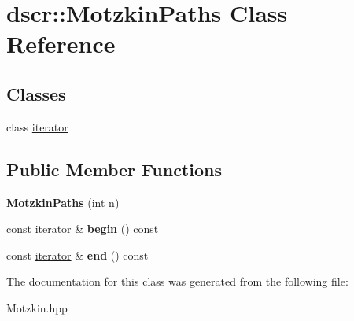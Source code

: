 \hypertarget{classdscr_1_1_motzkin_paths}{\section{dscr\-:\-:Motzkin\-Paths Class Reference}
\label{classdscr_1_1_motzkin_paths}
}
\subsection*{Classes}
\begin{DoxyCompactItemize}
\item 
class \hyperlink{classdscr_1_1_motzkin_paths_1_1iterator}{iterator}
\end{DoxyCompactItemize}
\subsection*{Public Member Functions}
\begin{DoxyCompactItemize}
\item 
\hypertarget{classdscr_1_1_motzkin_paths_a2599338546430b09220b7f2beb43b9d0}{{\bfseries Motzkin\-Paths} (int n)}\label{classdscr_1_1_motzkin_paths_a2599338546430b09220b7f2beb43b9d0}

\item 
\hypertarget{classdscr_1_1_motzkin_paths_aec54adae57f3db1d94ceb6624d14bdfa}{const \hyperlink{classdscr_1_1_motzkin_paths_1_1iterator}{iterator} \& {\bfseries begin} () const }\label{classdscr_1_1_motzkin_paths_aec54adae57f3db1d94ceb6624d14bdfa}

\item 
\hypertarget{classdscr_1_1_motzkin_paths_ad00aeb9077c766c780d030cd47df261a}{const \hyperlink{classdscr_1_1_motzkin_paths_1_1iterator}{iterator} \& {\bfseries end} () const }\label{classdscr_1_1_motzkin_paths_ad00aeb9077c766c780d030cd47df261a}

\end{DoxyCompactItemize}


The documentation for this class was generated from the following file\-:\begin{DoxyCompactItemize}
\item 
Motzkin.\-hpp\end{DoxyCompactItemize}
